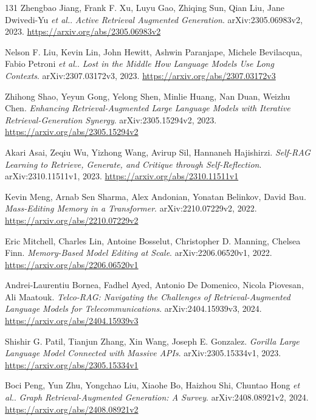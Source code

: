 \documentclass[11pt,a4paper]{article}
\begin{document}
\begin{thebibliography}{131}
Zhengbao Jiang, Frank F. Xu, Luyu Gao, Zhiqing Sun, Qian Liu, Jane Dwivedi-Yu \emph{et al.}.
\newblock \emph{Active Retrieval Augmented Generation}.
\newblock arXiv:2305.06983v2, 2023.
\newblock \url{https://arxiv.org/abs/2305.06983v2}

Nelson F. Liu, Kevin Lin, John Hewitt, Ashwin Paranjape, Michele Bevilacqua, Fabio Petroni \emph{et al.}.
\newblock \emph{Lost in the Middle How Language Models Use Long Contexts}.
\newblock arXiv:2307.03172v3, 2023.
\newblock \url{https://arxiv.org/abs/2307.03172v3}

Zhihong Shao, Yeyun Gong, Yelong Shen, Minlie Huang, Nan Duan, Weizhu Chen.
\newblock \emph{Enhancing Retrieval-Augmented Large Language Models with Iterative Retrieval-Generation Synergy}.
\newblock arXiv:2305.15294v2, 2023.
\newblock \url{https://arxiv.org/abs/2305.15294v2}

Akari Asai, Zeqiu Wu, Yizhong Wang, Avirup Sil, Hannaneh Hajishirzi.
\newblock \emph{Self-RAG Learning to Retrieve, Generate, and Critique through Self-Reflection}.
\newblock arXiv:2310.11511v1, 2023.
\newblock \url{https://arxiv.org/abs/2310.11511v1}

Kevin Meng, Arnab Sen Sharma, Alex Andonian, Yonatan Belinkov, David Bau.
\newblock \emph{Mass-Editing Memory in a Transformer}.
\newblock arXiv:2210.07229v2, 2022.
\newblock \url{https://arxiv.org/abs/2210.07229v2}

Eric Mitchell, Charles Lin, Antoine Bosselut, Christopher D. Manning, Chelsea Finn.
\newblock \emph{Memory-Based Model Editing at Scale}.
\newblock arXiv:2206.06520v1, 2022.
\newblock \url{https://arxiv.org/abs/2206.06520v1}

Andrei-Laurentiu Bornea, Fadhel Ayed, Antonio De Domenico, Nicola Piovesan, Ali Maatouk.
\newblock \emph{Telco-RAG: Navigating the Challenges of Retrieval-Augmented Language Models for Telecommunications}.
\newblock arXiv:2404.15939v3, 2024.
\newblock \url{https://arxiv.org/abs/2404.15939v3}

Shishir G. Patil, Tianjun Zhang, Xin Wang, Joseph E. Gonzalez.
\newblock \emph{Gorilla Large Language Model Connected with Massive APIs}.
\newblock arXiv:2305.15334v1, 2023.
\newblock \url{https://arxiv.org/abs/2305.15334v1}

Boci Peng, Yun Zhu, Yongchao Liu, Xiaohe Bo, Haizhou Shi, Chuntao Hong \emph{et al.}.
\newblock \emph{Graph Retrieval-Augmented Generation: A Survey}.
\newblock arXiv:2408.08921v2, 2024.
\newblock \url{https://arxiv.org/abs/2408.08921v2}


\end{thebibliography}
\end{document}
